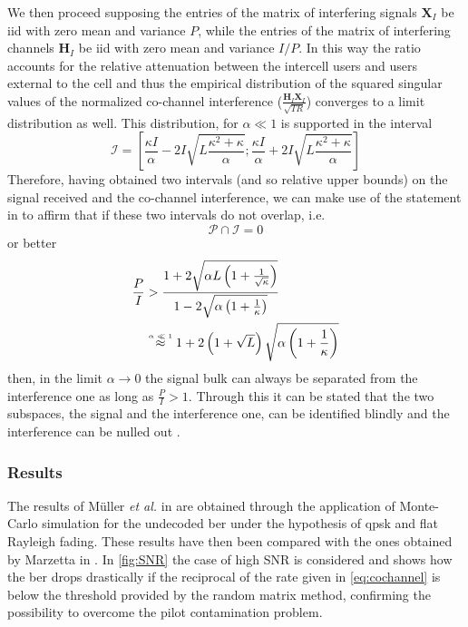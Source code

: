 \documentclass[11pt]{book}
\newcommand{\myeq}{\mathrel{\stackrel{\mbox{\normalfont\tiny{$\alpha \ll 1$}}}{\approx}}}
\begin{document}
We then proceed supposing the entries of the matrix of interfering signals $\mathbf{X}_I$ be iid with zero mean and variance $P$, while the entries of the matrix of interfering channels $\mathbf{H}_I$ be iid with zero mean and variance $I/P$. In this way the ratio accounts for the relative attenuation between the intercell users and users external to the cell and thus the empirical distribution of the squared singular values of the normalized co-channel interference ($\frac{\mathbf{H}_I\mathbf{X}_I}{\sqrt{TR}}$) converges to a limit distribution as well. This distribution, for $\alpha \ll 1$ is supported in the interval
\begin{equation}
  \mathcal{I} =  \left[\frac{\kappa I}{\alpha}-2I\sqrt{L\frac{\kappa^2 + \kappa}{\alpha}};\frac{\kappa I}{\alpha} + 2I\sqrt{L\frac{\kappa^2 + \kappa}{\alpha}}\right]
\end{equation}
Therefore, having obtained two intervals (and so relative upper bounds) on the signal received and the co-channel interference, we can make use of the statement in \cite{Ralf2012} to affirm that if these two intervals do not overlap, i.e.
\begin{equation}
  \mathcal{P}\cap \mathcal{I} = 0
\end{equation}
or better
\begin{align}
  \frac{P}{I} &> \frac{1 + 2\sqrt{\alpha L \left( 1 + \frac{1}{\sqrt{\kappa}} \right)}}{1 - 2 \sqrt{\alpha \left( 1 + \frac{1}{\kappa} \right)}}\\
  &\myeq 1 + 2 \left( 1 + \sqrt{L} \right)\sqrt{\alpha \left( 1 + \frac{1}{\kappa} \right)}
  \label{eq:cochannel}
\end{align}
then, in the limit $\alpha \rightarrow 0$ the signal bulk can always be separated from the interference one as long as $\frac{P}{I} > 1$. Through this it can be stated that the two subspaces, the signal and the interference one, can be identified blindly and the interference can be nulled out \cite{Ralf}.
\subsubsection{Results}
The results of M\"uller \textit{et al.} in \cite{Ralf} are obtained through the application of Monte-Carlo simulation for the undecoded \gls{ber} under the hypothesis of \gls{qpsk} and flat Rayleigh fading. These results have then been compared with the ones obtained by Marzetta in \cite{Marzetta2010}. In \autoref{fig:SNR} the case of high SNR is considered and shows how the \gls{ber} drops drastically if the reciprocal of the rate given in \ref{eq:cochannel} is below the threshold provided by the random matrix method, confirming the possibility to overcome the pilot contamination problem.
\end{document}
